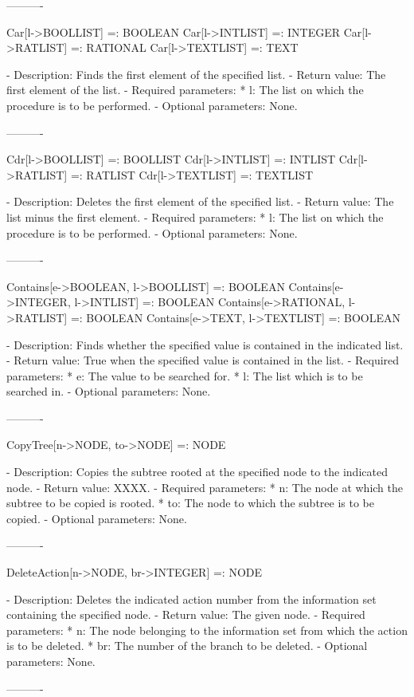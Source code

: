 ----------

Car[l->BOOLLIST] =: BOOLEAN
Car[l->INTLIST] =: INTEGER
Car[l->RATLIST] =: RATIONAL
Car[l->TEXTLIST] =: TEXT

   -	Description:  Finds the first element of the specified list.
   -	Return value:  The first element of the list.
   -	Required parameters:
	  *  l:  The list on which the procedure is to be performed.
   -	Optional parameters:  None.

----------

Cdr[l->BOOLLIST] =: BOOLLIST
Cdr[l->INTLIST] =: INTLIST
Cdr[l->RATLIST] =: RATLIST
Cdr[l->TEXTLIST] =: TEXTLIST

   -	Description:  Deletes the first element of the specified list.
   -	Return value:  The list minus the first element.
   -	Required parameters:
	  *  l:  The list on which the procedure is to be performed.
   -	Optional parameters:  None.

----------

Contains[e->BOOLEAN, l->BOOLLIST] =: BOOLEAN
Contains[e->INTEGER, l->INTLIST] =: BOOLEAN
Contains[e->RATIONAL, l->RATLIST] =: BOOLEAN
Contains[e->TEXT, l->TEXTLIST] =: BOOLEAN

   -	Description:  Finds whether the specified value is contained in the 
	indicated list.
   -	Return value:  True when the specified value is contained in the list.
   -	Required parameters:
	  *  e:  The value to be searched for.
	  *  l:  The list which is to be searched in.
   -	Optional parameters:  None.

----------

CopyTree[n->NODE, to->NODE] =: NODE

   -	Description:  Copies the subtree rooted at the specified node to the 
	indicated node.
   -	Return value:  XXXX.
   -	Required parameters:
	  *  n:  The node at which the subtree to be copied is rooted.
	  *  to:  The node to which the subtree is to be copied.
   -	Optional parameters:  None.

----------

DeleteAction[n->NODE, br->INTEGER] =: NODE

   -	Description:  Deletes the indicated action number from the information
	set containing the specified node.
   -	Return value:  The given node.
   -	Required parameters:
	  *  n:  The node belonging to the information set from which the 
	     action is to be deleted.
	  *  br:  The number of the branch to be deleted.
   -	Optional parameters:  None.

----------

